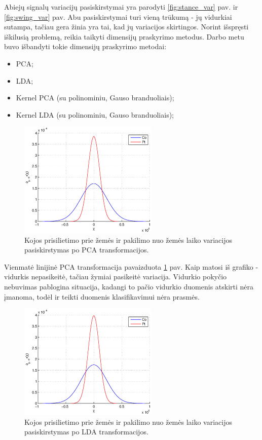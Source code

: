 \documentclass[]{vgtuef}
\begin{document}
Abiejų signalų variacijų pasiskirstymai yra parodyti \ref{fig:stance_var} pav. ir \ref{fig:swing_var} pav. Abu pasiskirstymai turi vieną trūkumą - jų vidurkiai sutampa, tačiau gera žinia yra tai, kad jų variacijos skirtingos. Norint išspręsti iškilusią problemą, reikia taikyti dimensijų praskyrimo metodus. Darbo metu buvo išbandyti tokie dimensijų praskyrimo metodai:

\begin{itemize}
\item PCA;
\item LDA;
\item Kernel PCA (su polinominiu, Gauso branduoliais);
\item Kernel LDA (su polinominiu, Gauso branduoliais);
\end{itemize}

\begin{figure}[!t]
  \centering
  \includegraphics[width=250px]{figures/st_sw_linear_kpca.eps}
  \caption{Kojos prisilietimo prie žemės ir pakilimo nuo žemės laiko
    variacijos pasiskirstymas po PCA transformacijos.}
  \label{fig:linear_pca}
\end{figure}

Vienmatė linijinė PCA transformacija pavaizduota \ref{fig:linear_pca} pav. Kaip matosi iš grafiko - vidurkis nepasikeitė, tačiau žymiai pasikeitė variacija. Vidurkio pokyčio nebuvimas pablogina situacija, kadangi to pačio vidurkio duomenis atskirti nėra įmanoma, todėl ir teikti duomenis klasifikavimui nėra prasmės.

\begin{figure}[!t]
  \centering
  \includegraphics[width=250px]{figures/st_sw_linear_lda.eps}
  \caption{Kojos prisilietimo prie žemės ir pakilimo nuo žemės laiko
    variacijos pasiskirstymas po LDA transformacijos.}
  \label{fig:linear_lda}
\end{figure}
\end{document}
